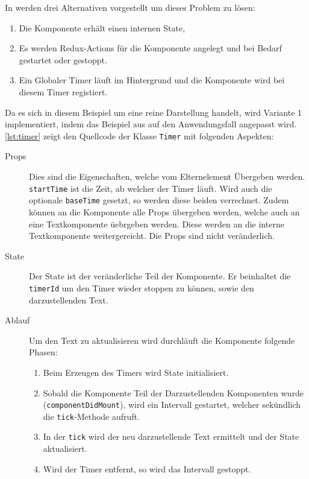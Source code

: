 In \cite{Timersin85:online} werden drei Alternativen vorgestellt um dieses Problem zu lösen:
\begin{enumerate}
    \item Die Komponente erhält einen internen State,
    \item Es werden Redux-Actions für die Komponente angelegt und bei Bedarf gestartet oder gestoppt.
    \item Ein Globaler Timer läuft im Hintergrund und die Komponente wird bei diesem Timer registiert.
\end{enumerate}

Da es sich in diesem Beispiel um eine reine Darstellung handelt,
wird Variante 1 implementiert, indem das Beispiel aus \cite{Timersin85:online} auf den Anwendungsfall angepasst wird.
\autoref{lst:timer} zeigt den Quellcode der Klasse \texttt{Timer} mit folgenden Aspekten:
\begin{description}
    \item[Props] Dies sind die Eigenschaften, welche vom Elternelement Übergeben werden.
    \texttt{startTime} ist die Zeit, ab welcher der Timer läuft.
    Wird auch die optionale \texttt{baseTime} gesetzt, so werden diese beiden verrechnet.
    Zudem können an die Komponente alle Props übergeben werden, welche auch an eine Textkomponente üebrgeben werden.
    Diese werden an die interne Textkomponente weitergereicht.
    Die Props sind nicht veränderlich.
    \item[State] Der State ist der veränderliche Teil der Komponente.
    Er beinhaltet die \texttt{timerId} um den Timer wieder stoppen zu können,
    sowie den darzustellenden Text.
    \item[Ablauf]
    Um den Text zu aktualisieren wird durchläuft die Komponente folgende Phasen:
    \begin{enumerate}
        \item Beim Erzeugen des Timers wird State initialisiert.
        \item Sobald die Komponente Teil der Darzustellenden Komponenten wurde (\texttt{componentDidMount}),
        wird ein Intervall gestartet, welcher sekündlich die \texttt{tick}-Methode aufruft.
        \item In der \texttt{tick} wird der neu darzustellende Text ermittelt und der State aktualisiert.
        \item Wird der Timer entfernt, so wird das Intervall gestoppt.
    \end{enumerate}
\end{description}

